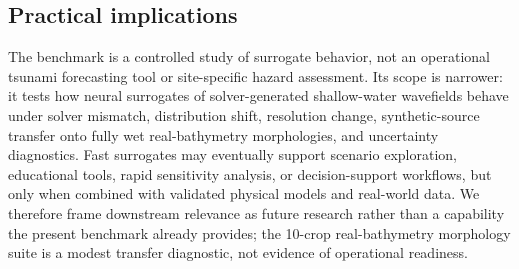 \subsection{Practical implications}
The benchmark is a controlled study of surrogate behavior, not an operational tsunami forecasting tool or site-specific hazard assessment. Its scope is narrower: it tests how neural surrogates of solver-generated shallow-water wavefields behave under solver mismatch, distribution shift, resolution change, synthetic-source transfer onto fully wet real-bathymetry morphologies, and uncertainty diagnostics. Fast surrogates may eventually support scenario exploration, educational tools, rapid sensitivity analysis, or decision-support workflows, but only when combined with validated physical models and real-world data. We therefore frame downstream relevance as future research rather than a capability the present benchmark already provides; the 10-crop real-bathymetry morphology suite is a modest transfer diagnostic, not evidence of operational readiness.
